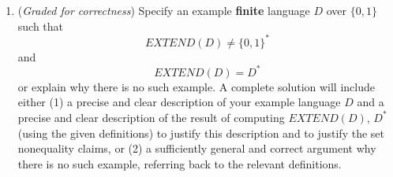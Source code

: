 \documentclass[12pt, oneside]{article}
\newcommand{\gradeCorrect}{({\it Graded for correctness}) }
\begin{document}
\begin{enumerate}[wide, labelwidth=!, labelindent=0pt]
\begin{enumerate}
    \item\gradeCorrect Specify an example {\bf finite} language $D$ over $\{0,1\}$ such that 
    $$EXTEND(D) \neq \{0,1\}^*$$ and $$EXTEND(D) = D^*$$or 
    explain why there is no such example.
    A complete solution will include either (1) a precise and
    clear description of your example language $D$ 
    and a precise and clear description of
    the result of computing $EXTEND(D)$, $D^*$ (using the given definitions)
    to justify this description and to justify the set nonequality claims, 
    or (2) a sufficiently general and correct argument
    why there is no such example, referring back to the relevant definitions.
    \end{enumerate}



    
    \end{enumerate}
\newpage
\end{document}
